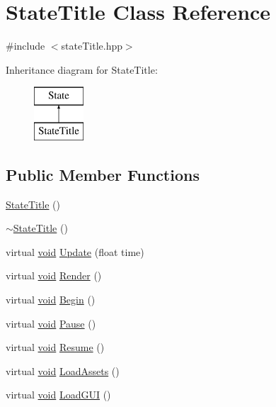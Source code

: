 \hypertarget{class_state_title}{\section{State\-Title Class Reference}
\label{class_state_title}
}


{\ttfamily \#include $<$state\-Title.\-hpp$>$}

Inheritance diagram for State\-Title\-:\begin{figure}[H]
\begin{center}
\leavevmode
\includegraphics[height=2.000000cm]{class_state_title}
\end{center}
\end{figure}
\subsection*{Public Member Functions}
\begin{DoxyCompactItemize}
\item 
\hyperlink{class_state_title_a407ffed9ae4da48c523d12a81efef8df}{State\-Title} ()
\item 
\hyperlink{class_state_title_a4b93c048c51629ac060a7a04fce14f08}{$\sim$\-State\-Title} ()
\item 
virtual \hyperlink{_s_d_l__opengles2__gl2ext_8h_ae5d8fa23ad07c48bb609509eae494c95}{void} \hyperlink{class_state_title_a407820de3e95376a459db406ebde34f2}{Update} (float time)
\item 
virtual \hyperlink{_s_d_l__opengles2__gl2ext_8h_ae5d8fa23ad07c48bb609509eae494c95}{void} \hyperlink{class_state_title_a4a967bd487216860a8d0ca6a34a334c2}{Render} ()
\item 
virtual \hyperlink{_s_d_l__opengles2__gl2ext_8h_ae5d8fa23ad07c48bb609509eae494c95}{void} \hyperlink{class_state_title_aaee854dfe8461f07f560976cfa4f0338}{Begin} ()
\item 
virtual \hyperlink{_s_d_l__opengles2__gl2ext_8h_ae5d8fa23ad07c48bb609509eae494c95}{void} \hyperlink{class_state_title_ac1a402cdf5fbd2a7035ee0367fb2c79f}{Pause} ()
\item 
virtual \hyperlink{_s_d_l__opengles2__gl2ext_8h_ae5d8fa23ad07c48bb609509eae494c95}{void} \hyperlink{class_state_title_acb25d1aed1f0c5474a4d71da45026ca5}{Resume} ()
\item 
virtual \hyperlink{_s_d_l__opengles2__gl2ext_8h_ae5d8fa23ad07c48bb609509eae494c95}{void} \hyperlink{class_state_title_a5784cb5fe5b9873d1ed2daf6c8875e1c}{Load\-Assets} ()
\item 
virtual \hyperlink{_s_d_l__opengles2__gl2ext_8h_ae5d8fa23ad07c48bb609509eae494c95}{void} \hyperlink{class_state_title_ad4547b2fa21aa4767ce943259c122f08}{Load\-G\-U\-I} ()
\end{DoxyCompactItemize}
